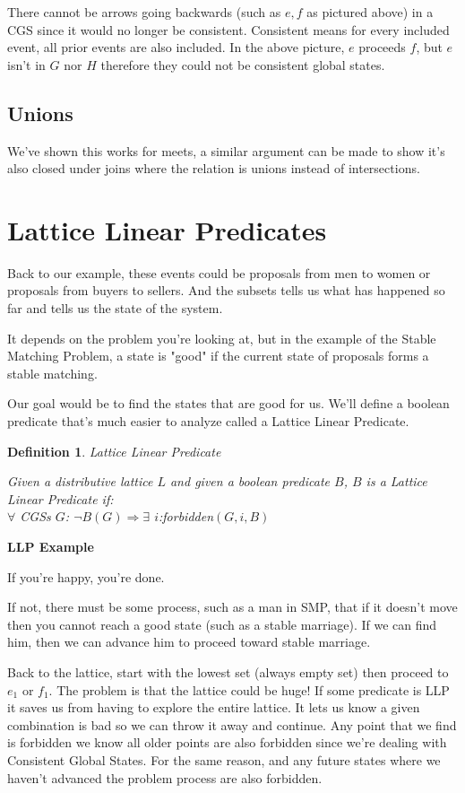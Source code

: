 \documentclass[twoside]{article}
\newtheorem{definition}[theorem]{Definition}
\begin{document}
There cannot be arrows going backwards (such as $e, f$ as pictured above) in a CGS since it would no longer be consistent. Consistent means for every included event, all prior events are also included. In the above picture, $e$ proceeds $f$, but $e$ isn't in $G$ nor $H$ therefore they could not be consistent global states.

\subsection{Unions}
We've shown this works for meets, a similar argument can be made to show it's also  closed under joins where the relation is unions instead of intersections.

\section{Lattice Linear Predicates}

Back to our example, these events could be proposals from men to women or proposals from buyers to sellers.  And the subsets tells us what has happened so far and tells us the state of the system.

It depends on the problem you're looking at, but in the example of the Stable Matching Problem, a state is "good" if the current state of proposals forms a stable matching. 

Our goal would be to find the states that are good for us. We'll define a boolean predicate that's much easier to analyze called a Lattice Linear Predicate.

\begin{definition}
Lattice Linear Predicate

Given a distributive lattice $L$ and given a boolean predicate $B$, $B$ is a Lattice Linear Predicate if:\\
$\forall$ CGSs $G$: $\neg B(G) \Rightarrow \exists$ $i$:forbidden$(G, i, B)$
\end{definition}

\textbf{LLP Example}

If you're happy, you're done.

If not, there must be some process, such as a man in SMP, that if it doesn't move then you cannot reach a good state (such as a stable marriage). If we can find him, then we can advance him to proceed toward stable marriage.

Back to the lattice, start with the lowest set (always empty set) then proceed to $e_1$ or $f_1$. The problem is that the lattice could be huge! If some predicate is LLP it saves us from having to explore the entire lattice. It lets us know a given combination is bad so we can throw it away and continue. Any point that we find is forbidden we know all older points are also forbidden since we're dealing with Consistent Global States. For the same reason, and any future states where we haven't advanced the problem process are also forbidden.
\end{document}
